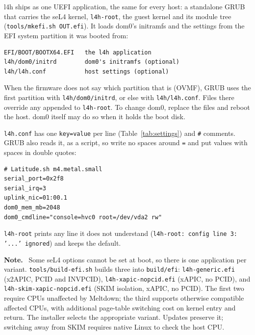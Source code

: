 \documentclass[11pt,a4paper]{report}
\newcommand{\cmd}[1]{\texttt{#1}}
\newcommand{\file}[1]{\texttt{#1}}
\newenvironment{caveat}{\par\medskip\noindent\color{note}\textbf{Note.}\ }{\par\medskip}
\begin{document}
l4h ships as one UEFI application, the same for every host: a standalone
GRUB that carries the seL4 kernel, \texttt{l4h-root}, the guest kernel and
its module tree (\cmd{tools/mkefi.sh OUT.efi}). It loads dom0's initramfs
and the settings from the EFI system partition it was booted from:
\begin{lstlisting}
EFI/BOOT/BOOTX64.EFI   the l4h application
l4h/dom0/initrd        dom0's initramfs (optional)
l4h/l4h.conf           host settings (optional)
\end{lstlisting}
When the firmware does not say which partition that is (OVMF), GRUB uses
the first partition with \file{l4h/dom0/initrd}, or else with
\file{l4h/l4h.conf}. Files there override any appended to
\texttt{l4h-root}. To change dom0, replace the files and
reboot the host. dom0 itself may do so when it holds the boot disk.

\file{l4h.conf} has one \texttt{key=value} per line (Table~\ref{tab:settings})
and \texttt{\#} comments. GRUB also reads it, as a script, so write no
spaces around \texttt{=} and put values with spaces in double quotes:
\begin{lstlisting}
# Latitude.sh m4.metal.small
serial_port=0x2f8
serial_irq=3
uplink_nic=01:00.1
dom0_mem_mb=2048
dom0_cmdline="console=hvc0 root=/dev/vda2 rw"
\end{lstlisting}
\texttt{l4h-root} prints any line it does not understand
(\texttt{l4h-root: config line 3: '...' ignored}) and keeps the default.

\begin{caveat}
Some seL4 options cannot be set at boot, so there is one application per
variant. \cmd{tools/build-efi.sh} builds three into \file{build/efi}:
\file{l4h-generic.efi} (x2APIC, PCID and INVPCID),
\file{l4h-xapic-nopcid.efi} (xAPIC, no PCID), and
\file{l4h-skim-xapic-nopcid.efi} (SKIM isolation, xAPIC, no PCID).
The first two require CPUs unaffected by Meltdown; the third supports
otherwise compatible affected CPUs, with additional page-table switching
cost on kernel entry and return. The installer selects the appropriate
variant. Updates preserve it; switching away from SKIM requires native
Linux to check the host CPU.
\end{caveat}
\end{document}
